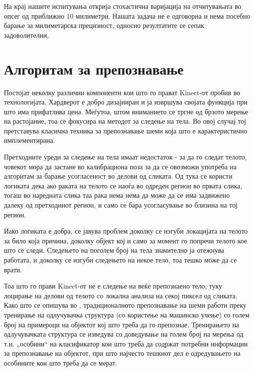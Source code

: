 \documentclass[12pt]{article}
\begin{document}
    На крај нашите испитувања открија стохастична варијација на отчитувањата во опсег од приближно 10 милиметри. Нашата задача не е одговорна и нема посебно барање за милиметарска прецизност, односно резултатите се сепак задоволителни.

\newpage

\section{Алгоритам за препознавање}

  Постојат неколку различни компоненти кои што го прават Kinect-от пробив во технологијата. Хардверот е добро дизајниран и ја извршува својата функција при што има прифатлива цена. Меѓутоа, штом вниманието се тргне од брзото мерење на растојание, тоа се фокусира на методот за следење на тела. Во овој случај тој претставува класична техника за препознавање шеми која што е карактеристично имплементирана.\bigbreak

	Претходните уреди за следење на тела имаат недостаток - за да го следат телото, човекот мора да застане во калибрациона поза за да се овозможи употреба на алгоритам за барање усогласеност во делови од сликата. Од тука се користи логиката дека ако раката на телото се наоѓа во одреден регион во првата слика, тогаш во наредната слика таа рака нема нема да може да се има задвижено далеку од претходниот регион, и само се бара усогласување во близина на тој регион.\bigbreak

	Иако логиката е добра, се јавува проблем доколку се изгуби локацијата на телото за било која причина, доколку објект кој и само за момент го попречи телото кое што се следи. Следењето на поголем број на тела значително ја отежнува работата, и доколку се изгуби следењето на некое тело, тоа тешко може да се врати.\bigbreak

	Тоа што го прави Kinect-от не е следење на веќе препознаено тело, туку лоцирање на делови од телото со локална анализа на секој пиксел од сликата. Како што се опишува во \cite{machinelearning}, традиционалното препознавање на шеми работи преку тренирање на одлучувачка структура (со користење на машинско учење) со голем број на примероци на објектот кој што треба да го препознае. Тренирањето на одлучувачката структура се изведува со доведување на голем број на мерења од т.н. „особини“ на класификатор кои што треба да содржат потребни информации за препознавање на објектот, при што најчесто тешкиот дел е одредувањето на особините кои што треба да се мерат.\bigbreak
\end{document}
